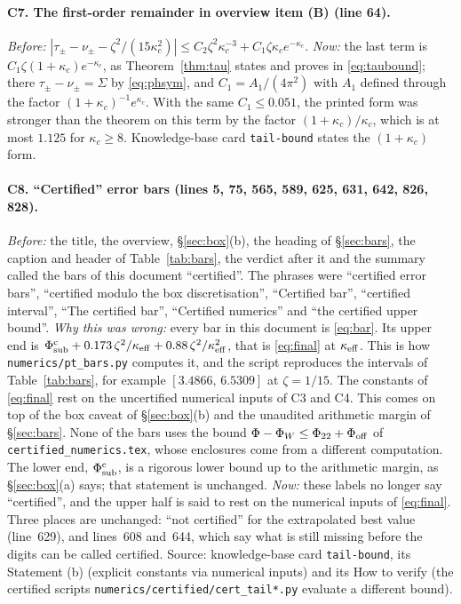 \documentclass[11pt]{article}
\begin{document}
\paragraph{C7. The first-order remainder in overview item (B) (line 64).}
\emph{Before:} $|\tau_\pm-\nu_\pm-\zeta^2/(15\kappa_c^2)|\le C_2\zeta^2\kappa_c^{-3}
+C_1\zeta\kappa_ce^{-\kappa_c}$.  \emph{Now:} the last term is $C_1\zeta(1+\kappa_c)e^{-\kappa_c}$,
as Theorem~\ref{thm:tau} states and proves in \eqref{eq:taubound}; there $\tau_\pm-\nu_\pm=\Sigma$ by
\eqref{eq:phsym}, and $C_1=A_1/(4\pi^2)$ with $A_1$ defined through the factor
$(1+\kappa_c)^{-1}e^{\kappa_c}$.  With the same $C_1\le0.051$, the printed form was stronger than the
theorem on this term by the factor $(1+\kappa_c)/\kappa_c$, which is at most $1.125$ for
$\kappa_c\ge8$.  Knowledge-base card \texttt{tail-bound} states the $(1+\kappa_c)$ form.

\paragraph{C8. ``Certified'' error bars (lines 5, 75, 565, 589, 625, 631, 642, 826, 828).}
\emph{Before:} the title, the overview, \S\ref{sec:box}(b), the heading of \S\ref{sec:bars}, the
caption and header of Table~\ref{tab:bars}, the verdict after it and the summary called the bars of
this document ``certified''.  The phrases were ``certified error bars'', ``certified modulo the box
discretisation'', ``Certified bar'', ``certified interval'', ``The certified bar'', ``Certified
numerics'' and ``the certified upper bound''.
\emph{Why this was wrong:} every bar in this document is \eqref{eq:bar}.  Its upper end is
$\Phi^{\rm c}_{\rm sub}+0.173\,\zeta^2/\kappa_{\rm eff}+0.88\,\zeta^2/\kappa_{\rm eff}^2$, that is
\eqref{eq:final} at $\kappa_{\rm eff}$.  This is how \texttt{numerics/pt\_bars.py} computes it, and
the script reproduces the intervals of Table~\ref{tab:bars}, for example $[3.4866,\,6.5309]$ at
$\zeta=1/15$.  The constants of \eqref{eq:final} rest on the uncertified numerical inputs of C3 and
C4.  This comes on top of the box caveat of \S\ref{sec:box}(b) and the unaudited arithmetic margin
of \S\ref{sec:bars}.  None of the bars uses the bound $\Phi-\Phi_W\le\Phi_{22}+\Phi_{\rm off}$ of
\texttt{certified\_numerics.tex}, whose enclosures come from a different computation.  The lower
end, $\Phi^{\rm c}_{\rm sub}$, is a rigorous lower bound up to the arithmetic margin, as
\S\ref{sec:box}(a) says; that statement is unchanged.
\emph{Now:} these labels no longer say ``certified'', and the upper half is said to rest on the
numerical inputs of \eqref{eq:final}.  Three places are unchanged: ``not certified'' for the
extrapolated best value (line~629), and lines~608 and~644, which say what is still missing before
the digits can be called certified.  Source: knowledge-base card \texttt{tail-bound}, its Statement
(b) (explicit constants via numerical inputs) and its How to verify (the certified scripts
\texttt{numerics/certified/cert\_tail*.py} evaluate a different bound).
\end{document}
